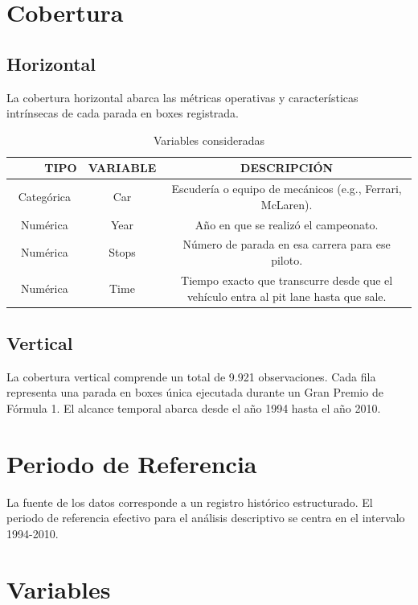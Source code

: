 \documentclass[oneside,11pt]{Latex/Classes/PhDthesisPSnPDF}
\begin{document}
\section{Cobertura}

\subsection{Horizontal}

La cobertura horizontal abarca las métricas operativas y características
intrínsecas de cada parada en boxes registrada.

\begin{table}[ht]
\centering
\caption{Variables consideradas} 
\resizebox{17cm}{!} {
\begin{tabular}{ccc}
  \hline
\ \ \ \ \ TIPO&VARIABLE&DESCRIPCIÓN \\ 
\hline
          Categórica & Car & Escudería o equipo de mecánicos (e.g., Ferrari, McLaren).\\ 
          Numérica & Year & Año en que se realizó el campeonato.\\ 
          Numérica & Stops & Número de parada en esa carrera para ese piloto.\\ 
          Numérica & Time & Tiempo exacto que transcurre desde que el vehículo entra al pit lane hasta que sale.\\ 
  \hline
\end{tabular}
}
\end{table}

\subsection{Vertical}

La cobertura vertical comprende un total de 9.921 observaciones. Cada
fila representa una parada en boxes única ejecutada durante un Gran
Premio de Fórmula 1. El alcance temporal abarca desde el año 1994 hasta
el año 2010.

\section{Periodo de Referencia}

La fuente de los datos corresponde a un registro histórico estructurado.
El periodo de referencia efectivo para el análisis descriptivo se centra
en el intervalo 1994-2010.

\section{Variables}
\end{document}
